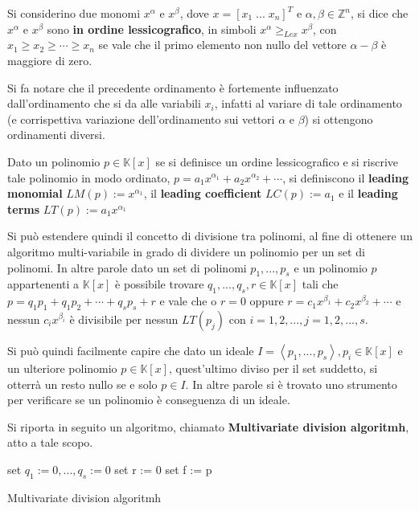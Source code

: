 \begin{defn}
	Si considerino due monomi $x^{\alpha}$ e $x^{\beta}$, dove $x = [x_1 \; ... \; x_n]^T$ e $\alpha, \beta \in \mathbb{Z}^n$, si dice che $x^{\alpha}$ e $x^{\beta}$ sono \textbf{in ordine lessicografico}, in simboli $x^{\alpha} \ge_{Lex} x^{\beta}$, con $x_1 \ge x_2 \ge \cdots \ge x_n$ se vale che
	il primo elemento non nullo del vettore $\alpha-\beta$ è maggiore di zero.	
\end{defn}
Si fa notare che il precedente ordinamento è fortemente influenzato dall'ordinamento che si da alle variabili $x_i$, infatti al variare di tale ordinamento (e corrispettiva variazione dell'ordinamento sui vettori $\alpha$ e $\beta$) si ottengono ordinamenti diversi.

\begin{defn}
	Dato un polinomio $p \in \mathbb{K}[x]$ se si definisce un ordine lessicografico e si riscrive tale polinomio in modo ordinato, $ p = a_1x^{\alpha_1} + a_2x^{\alpha_2} + \cdots $,  si definiscono il \textbf{leading monomial} $LM(p) := x^{\alpha_1}$, il \textbf{leading coefficient} $LC(p) := a_1$ e il \textbf{leading terms} $LT(p) := a_1x^{\alpha_1}$
\end{defn}
Si può estendere quindi il concetto di divisione tra polinomi, al fine di ottenere un algoritmo multi-variabile in grado di dividere un polinomio per un set di polinomi. In altre parole dato un set di polinomi $p_1, ..., p_s$ e un polinomio $p$ appartenenti a $\mathbb{K}[x]$ è possibile trovare $q_1, ... , q_s, r \in \mathbb{K}[x]$ tali che $p = q_1p_1 + q_1p_2 + \cdots + q_sp_s + r$ e vale che o $r = 0$ oppure $r = c_1x^{\beta_1} + c_2x^{\beta_2} + \cdots $ e nessun $c_ix^{\beta_i}$ è divisibile per nessun $LT(p_j)$ con $i = 1,2,..., j = 1, 2,..., s$.

\begin{obs}
	Si può quindi facilmente capire che dato un ideale $I = \left\langle p_1, ..., p_s \right\rangle, p_i \in \mathbb{K}[x]$ e un ulteriore polinomio $p \in \mathbb{K}[x]$, quest'ultimo diviso per il set suddetto, si otterrà un resto nullo se e solo $ p \in I$. In altre parole si è trovato uno strumento per verificare se un polinomio è conseguenza di un ideale.
\end{obs}

Si riporta in seguito un algoritmo, chiamato \textbf{Multivariate division algoritmh}, atto a tale scopo. \\

\begin{algorithm}[H]
	\SetAlgoLined
	set $q_1 := 0, ..., q_s := 0$\;
	set r := 0\;
	set f := p\;
	\caption{Multivariate division algoritmh}
\end{algorithm}

